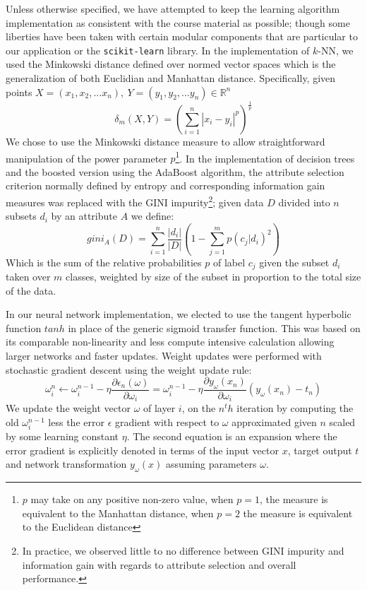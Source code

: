 \documentclass[12pt]{article}
\begin{document}
Unless otherwise specified, we have attempted to keep the learning algorithm implementation as consistent with the course material as possible; though some liberties have been taken with certain modular components that are particular to our application or the \texttt{scikit-learn} library. In the implementation of $k$-NN, we used the Minkowski distance defined over normed vector spaces which is the generalization of both Euclidian and Manhattan distance. Specifically, given points $X = (x_1, x_2, ... x_n), \ Y = (y_1, y_2, ... y_n) \in \mathbb{R}^n$
\begin{equation}
\delta_m(X,Y) = (\sum_{i=1}^n|x_i-y_i|^p)^{\frac{1}{p}}
\end{equation}
We chose to use the Minkowski distance measure to allow straightforward manipulation of the power parameter $p$\footnote{$p$ may take on any positive non-zero value, when $p=1$, the measure is equivalent to the Manhattan distance, when $p=2$ the measure is equivalent to the Euclidean distance}. In the implementation of decision trees and the boosted version using the AdaBoost algorithm, the attribute selection criterion normally defined by entropy and corresponding information gain measures was replaced with the GINI impurity\footnote{In practice, we observed little to no difference between GINI impurity and information gain with regards to attribute selection and overall performance.}; given data $D$ divided into $n$ subsets $d_i$ by an attribute $A$ we define:
\begin{equation}
gini_A(D) = \sum_{i=1}^n\frac{|d_i|}{|D|}(1-\sum_{j=1}^m p(c_j|d_i)^2)
\end{equation}
Which is the sum of the relative probabilities $p$ of label $c_j$ given the subset $d_i$ taken over $m$ classes, weighted by size of the subset in proportion to the total size of the data.

In our neural network implementation, we elected to use the tangent hyperbolic function $tanh$ in place of the generic sigmoid transfer function. This was based on its comparable non-linearity and less compute intensive calculation allowing larger networks and faster updates. Weight updates were performed with stochastic gradient descent using the weight update rule:
\begin{equation}
\omega_i^n \leftarrow \omega_i^{n-1}-\eta \frac{\partial\epsilon_n(\omega)}{\partial\omega_i} = \omega_i^{n-1}-\eta \frac{\partial y_\omega(x_n)}{\partial \omega_i}(y_\omega(x_n)-t_n)
\end{equation}
We update the weight vector $\omega$ of layer $i$, on the $n^th$ iteration by computing the old $\omega_i^{n-1}$ less the error $\epsilon$ gradient with respect to $\omega$ approximated given $n$ scaled by some learning constant $\eta$. The second equation is an expansion where the error gradient is explicitly denoted in terms of the input vector $x$, target output $t$ and network transformation $y_\omega(x)$ assuming parameters $\omega$.
\end{document}
